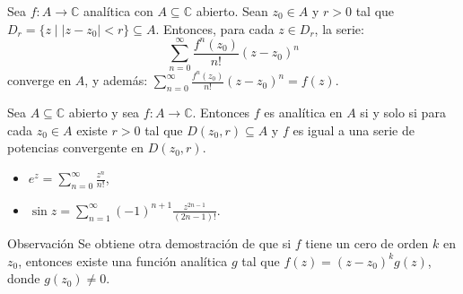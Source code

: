 \documentclass[spanish,presentation]{beamer}
\begin{document}
\begin{frame}[label=sec-3-1]{}
\begin{theorem}[Taylor]
Sea \(f\colon A\to \mathbb{C}\) analítica con \(A\subseteq
    \mathbb{C}\) abierto. Sean \(z_{0}\in A\) y \(r>0\) tal que
\(D_{r}=\{z\mid |z-z_{0}|<r\}\subseteq A\). Entonces, para cada
\(z\in D_{r}\), la serie:
\begin{displaymath}
\sum_{n=0}^{\infty} \frac{f^{n}(z_{0})}{n!}(z-z_{0})^{n}
\end{displaymath}
converge en \(A\), y además: \(\sum_{n=0}^{\infty}
    \frac{f^{n}(z_{0})}{n!}(z-z_{0})^{n}=f(z)\).
\end{theorem}
\end{frame}

\begin{frame}[label=sec-3-2]{}
\begin{corollary}
Sea \(A\subseteq \mathbb{C}\) abierto y sea \(f\colon A\to
    \mathbb{C}\). Entonces \(f\) es analítica en \(A\) si y solo si
para cada \(z_{0}\in A\) existe \(r>0\) tal que
\(D(z_{0},r)\subseteq A\) y \(f\) es igual a una serie de
potencias convergente en \(D(z_{0},r)\).
\end{corollary}

\begin{block}{}
\begin{itemize}
\item \(e^{z}=\sum_{n=0}^{\infty}\frac{z^{n}}{n!}\),
\item \(\sin z=\sum_{n=1}^{\infty}(-1)^{n+1}\frac{z^{2n-1}}{(2n-1)!}\).
\end{itemize}
\end{block}

\begin{block}{Observación}
Se obtiene otra demostración de que si \(f\) tiene un cero de
orden \(k\) en \(z_{0}\), entonces existe una función analítica
\(g\) tal que \(f(z)=(z-z_{0})^{k}g(z)\), donde \(g(z_{0})\ne0\).
\end{block}
\end{frame}
\end{document}
